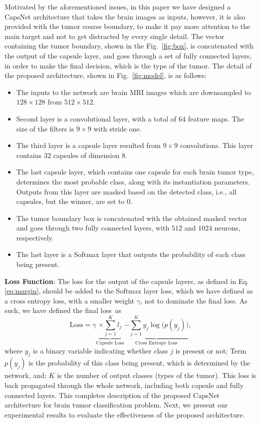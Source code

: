 \documentclass{article}
\begin{document}
Motivated by the aforementioned issues, in this paper we have designed a CapsNet architecture that takes the brain images as inputs, however, it is also provided with the tumor course boundary, to make it pay more attention to the main target and not to get distracted by every single detail. The vector containing the tumor boundary, shown in the Fig.~\ref{fig:box}, is concatenated with the output of the capsule layer, and goes through a set of fully connected layers, in order to make the final decision, which is the type of the tumor. The detail of the proposed architecture, shown in Fig.~\ref{fig:model}, is as follows:
\begin{itemize}
\item The inputs to the network are brain MRI images which are downsampled to $128 \times 128$ from $512 \times 512$.
\vspace{-.0125in}
\item Second layer is a convolutional layer, with a total of $64$ feature maps. The size of the filters is $9 \times 9$ with stride one.
\vspace{-.0125in}
\item The third layer is a capsule layer resulted from $9 \times 9$ convolutions. This layer contains $32$ capsules of dimension $8$.
\vspace{-.0125in}
\item The last capsule layer, which contains one capsule for each brain tumor type, determines the most probable class, along with its instantiation parameters. Outputs from this layer are masked based on the detected class, i.e., all capsules, but the winner, are set to $0$.
\vspace{-.0125in}
\item The tumor boundary box is concatenated with the obtained masked vector and goes through two fully connected layers, with $512$ and $1024$ neurons, respectively.
\vspace{-.0125in}
\item The last layer is a Softmax layer that outputs the probability of each class being present.
\end{itemize}
\textbf{Loss Function}: The loss for the output of the capsule layers, as defined in Eq. \eqref{eq:margin}, should be added to the Softmax layer loss, which we have defined as a cross entropy loss, with a smaller weight $\gamma$, not to dominate the final loss. As such, we have defined the final loss~as
\begin{equation}
\label{eq:fin}
\text{Loss} = \gamma\underbrace{\times \sum_{j=1}^{K}l_j}_{\text{Capsule Loss}}  \underbrace{-\sum_{j=1}^{K}y_j \log\big(p(y_j)\big)}_{\text{Cross Entropy Loss}},
\end{equation}
where $y_j$ is a binary variable indicating whether class $j$ is present or not; Term $p(y_j)$ is the probability of this class being present, which is determined by the network, and; $K$ is the number of output classes (types of the tumor). This loss is back propagated through the whole network, including both capsule and fully connected layers.  This completes description of the proposed CapsNet architecture for brain tumor classification problem. Next, we present our experimental results to evaluate the  effectiveness of the proposed architecture.
\end{document}
